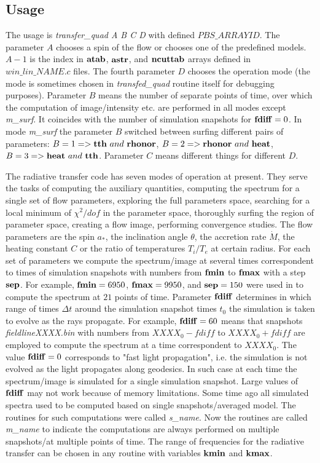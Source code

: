 \documentclass{emulateapj}
\begin{document}
\subsection{Usage}
The usage is \textit{transfer\_quad A B C D} with defined $PBS\_ARRAYID$.
The parameter $A$ chooses a spin of the flow or chooses one of the predefined models. $A-1$ is the index in ${\bf atab}$, ${\bf astr}$, and ${\bf ncuttab}$ arrays defined in
$\textit{win\_lin\_NAME.c}$ files. The fourth parameter $D$ chooses the operation mode (the mode is sometimes chosen in \textit{transfed\_quad} routine itself for debugging purposes).
Parameter $B$ means the number of separate points of time, over which the computation of image/intensity etc. are performed in all modes except \textit{m\_surf}.
It coincides with the number of simulation snapshots for ${\bf fdiff}=0$. In mode \textit{m\_surf} the parameter $B$ switched between surfing different pairs of parameters:
$B=1 => {\bf tth}~and~{\bf rhonor}$, $B=2 => {\bf rhonor}~and~{\bf heat}$, $B=3 => {\bf heat}~and~{\bf tth}$.
Parameter $C$ means different things for different $D$.

The radiative transfer code has seven modes of operation at present. They serve the tasks of computing the auxiliary quantities,
computing the spectrum for a single set of flow parameters, exploring the full parameters space, searching for a local minimum of $\chi^2/dof$ in the parameter space,
thoroughly surfing the region of parameter space, creating a flow image, performing convergence studies.
The flow parameters are the spin $a_*$, the inclination angle $\theta$, the accretion rate $\dot{M}$, the heating constant $C$ or the ratio of temperatures $T_i/T_e$ at certain radius.
For each set of parameters we compute the spectrum/image at several times correspondent to times of simulation snapshots with numbers from ${\bf fmin}$ to 
${\bf fmax}$ with a step ${\bf sep}$. For example, ${\bf fmin}=6950$, ${\bf fmax}=9950$, and ${\bf sep}=150$ were used in \citet{Shcherbakov:2012appl} 
to compute the spectrum at $21$ points of time. Parameter ${\bf fdiff}$ determines in which range of times $\Delta t$ around the simulation snapshot times $t_0$ 
the simulation is taken to evolve as the rays propagate. For example, ${\bf fdiff}=60$ means that snapshots \textit{fieldlineXXXX.bin} with numbers from $XXXX_0-fdiff$ to $XXXX_0+fdiff$ 
are employed to compute the spectrum at a time correspondent to $XXXX_0$. The value ${\bf fdiff}=0$ corresponds to "fast light propagation", i.e. the simulation is not evolved 
as the light propagates along geodesics. In such case at each time the spectrum/image is simulated for a single simulation snapshot. Large values of ${\bf fdiff}$ 
may not work because of memory limitations. Some time ago all simulated spectra used to be computed based on single snapshots/averaged model.
The routines for such computations were called \textit{s\_name}. Now the routines are called \textit{m\_name} to indicate
the computations are always performed on multiple snapshots/at multiple points of time.
The range of frequencies for the radiative transfer can be chosen in any routine with variables ${\bf kmin}$ and ${\bf kmax}$.
\end{document}
